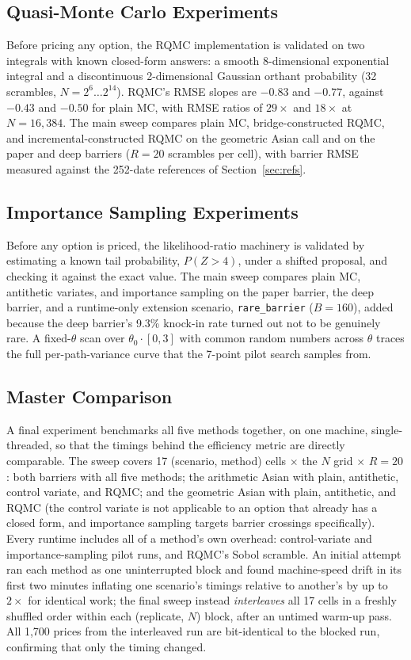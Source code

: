 \documentclass[sigconf]{acmart}
\begin{document}
\subsection{Quasi-Monte Carlo Experiments}
Before pricing any option, the RQMC implementation is validated on two
integrals with known closed-form answers: a smooth 8-dimensional exponential
integral and a discontinuous 2-dimensional Gaussian orthant probability
(32 scrambles, $N=2^6\ldots2^{14}$). RQMC's RMSE slopes are $-0.83$ and
$-0.77$, against $-0.43$ and $-0.50$ for plain MC, with RMSE ratios of
$29\times$ and $18\times$ at $N=16{,}384$. The main sweep compares
plain MC, bridge-constructed RQMC, and incremental-constructed RQMC on the
geometric Asian call and on the paper and deep barriers ($R=20$ scrambles
per cell), with barrier RMSE measured against the 252-date references of
Section~\ref{sec:refs}.

\subsection{Importance Sampling Experiments}
Before any option is priced, the likelihood-ratio machinery is validated by
estimating a known tail probability, $P(Z>4)$, under a shifted proposal, and
checking it against the exact value. The main sweep compares plain MC,
antithetic variates, and importance sampling on the paper barrier, the deep
barrier, and a runtime-only extension scenario, \texttt{rare\_barrier}
($B=160$), added because the deep barrier's 9.3\% knock-in rate turned out
not to be genuinely rare. A fixed-$\theta$ scan over $\theta_0\cdot[0,3]$ with
common random numbers across $\theta$ traces the full per-path-variance
curve that the 7-point pilot search samples from.

\subsection{Master Comparison}
\label{sec:master-protocol}
A final experiment benchmarks all five methods together, on one machine,
single-threaded, so that the timings behind the efficiency metric are
directly comparable. The sweep covers 17 (scenario, method) cells $\times$
the $N$ grid $\times$ $R=20$: both barriers with all five methods; the
arithmetic Asian with plain, antithetic, control variate, and RQMC; and the
geometric Asian with plain, antithetic, and RQMC (the control variate is not
applicable to an option that already has a closed form, and importance
sampling targets barrier crossings specifically). Every runtime includes all
of a method's own overhead: control-variate and importance-sampling pilot
runs, and RQMC's Sobol scramble. An initial attempt ran each method as one
uninterrupted block and found machine-speed drift in its first two minutes
inflating one scenario's timings relative to another's by up to $2\times$ for
identical work; the final sweep instead \emph{interleaves} all 17 cells in a
freshly shuffled order within each (replicate, $N$) block, after an untimed
warm-up pass. All 1{,}700 prices from the interleaved run are bit-identical
to the blocked run, confirming that only the timing changed.
\end{document}
